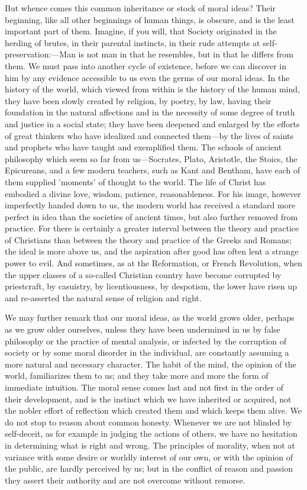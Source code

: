 \documentclass[11pt,letter]{article}
\begin{document}
\par  But whence comes this common inheritance or stock of moral ideas? Their beginning, like all other beginnings of human things, is obscure, and is the least important part of them. Imagine, if you will, that Society originated in the herding of brutes, in their parental instincts, in their rude attempts at self-preservation:—Man is not man in that he resembles, but in that he differs from them. We must pass into another cycle of existence, before we can discover in him by any evidence accessible to us even the germs of our moral ideas. In the history of the world, which viewed from within is the history of the human mind, they have been slowly created by religion, by poetry, by law, having their foundation in the natural affections and in the necessity of some degree of truth and justice in a social state; they have been deepened and enlarged by the efforts of great thinkers who have idealized and connected them—by the lives of saints and prophets who have taught and exemplified them. The schools of ancient philosophy which seem so far from us—Socrates, Plato, Aristotle, the Stoics, the Epicureans, and a few modern teachers, such as Kant and Bentham, have each of them supplied 'moments' of thought to the world. The life of Christ has embodied a divine love, wisdom, patience, reasonableness. For his image, however imperfectly handed down to us, the modern world has received a standard more perfect in idea than the societies of ancient times, but also further removed from practice. For there is certainly a greater interval between the theory and practice of Christians than between the theory and practice of the Greeks and Romans; the ideal is more above us, and the aspiration after good has often lent a strange power to evil. And sometimes, as at the Reformation, or French Revolution, when the upper classes of a so-called Christian country have become corrupted by priestcraft, by casuistry, by licentiousness, by despotism, the lower have risen up and re-asserted the natural sense of religion and right.

\par  We may further remark that our moral ideas, as the world grows older, perhaps as we grow older ourselves, unless they have been undermined in us by false philosophy or the practice of mental analysis, or infected by the corruption of society or by some moral disorder in the individual, are constantly assuming a more natural and necessary character. The habit of the mind, the opinion of the world, familiarizes them to us; and they take more and more the form of immediate intuition. The moral sense comes last and not first in the order of their development, and is the instinct which we have inherited or acquired, not the nobler effort of reflection which created them and which keeps them alive. We do not stop to reason about common honesty. Whenever we are not blinded by self-deceit, as for example in judging the actions of others, we have no hesitation in determining what is right and wrong. The principles of morality, when not at variance with some desire or worldly interest of our own, or with the opinion of the public, are hardly perceived by us; but in the conflict of reason and passion they assert their authority and are not overcome without remorse.
\end{document}

